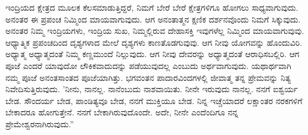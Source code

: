 ಇಂದ್ರಿಯದ ಕ್ಷೇತ್ರದ ಮೂಲಕ ಕೆಲಸಮಾಡುತ್ತಿದ್ದರೆ, ನಿಮಗೆ ಬೇರೆ ಬೇರೆ ಕ್ಷೇತ್ರಗಳಿಗೂ ಹೋಗಲು ಸಾಧ್ಯವಾಗುವುದು. ಅನಂತರ ಈ ಪ್ರಪಂಚ ನಿಮ್ಮಿಂದ ಮಾಯವಾಗುವುದು. ಆಗ ಅನಂತಾತ್ಮನ ಕ್ಷಣಿಕ ದರ್ಶನವೊಂದು ನಿಮಗೆ ಸಿಕ್ಕುವುದು. ಅನಂತರ ನಿಮ್ಮ ಇಂದ್ರಿಯಗಳು, ಇಂದ್ರಿಯ ಸುಖ, ನಿಮ್ಮಲ್ಲಿರುವ ದೇಹಾಸಕ್ತಿ ಇವುಗಳೆಲ್ಲ ನಿಮ್ಮಿಂದ ಮಾಯವಾಗುವುವು. ಆಧ್ಯಾತ್ಮಿಕ ಪ್ರಪಂಚದಿಂದ ದೃಶ್ಯಗಳಾದ ಮೇಲೆ ದೃಶ್ಯಗಳು ಕಾಣತೊಡಗುವುವು. ಆಗ ನೀವು ಯೋಗವನ್ನು ಹೊಂದುವಿರಿ. ಅಧ್ಯಾತ್ಮ ಅಧ್ಯಾತ್ಮದಂತೆ ನಿಮ್ಮ ಕಣ್ಣಮುಂದೆ ನಿಲ್ಲುವುದು. ಆಗ ನೀವು ದೇವರನ್ನು ಅಧ್ಯಾತ್ಮದಂತೆ ಆರಾಧಿಸಬಲ್ಲಿರಿ. ಆಗ ಪೂಜೆ ಎಂದರೆ ಯಾವುದೋ ಲೌಕಿಕವಾದುದನ್ನು ಪಡೆಯುವುದಲ್ಲ ಎಂಬುದು ಅರ್ಥವಾಗುವುದು. ಯಥಾರ್ಥವಾಗಿ ನಮ್ಮ ಪೂಜೆ ಅನಂತಸಾಂತದ ಪೂಜೆಯಾಗಿತ್ತು. ಭಗವಂತನ ಪಾದಾರವಿಂದಗಳಲ್ಲಿ ಜೀವಾತ್ಮ ತನ್ನ ಪ್ರೇಮವನ್ನು ನಿತ್ಯ ನಿವೇದಿಸುತ್ತಿರುವುದು. 'ನೀನು, ನಾನಲ್ಲ. ನಾನೆಂಬುದು ನಾಶವಾಯಿತು. ನೀನೇ ಇರುವುದು ನಾನಲ್ಲ. ನನಗೆ ಐಶ್ವರ್ಯ ಬೇಡ. ಸೌಂದರ್ಯ ಬೇಡ, ಪಾಂಡಿತ್ಯವೂ ಬೇಡ, ನನಗೆ ಮುಕ್ತಿಯೂ ಬೇಡ. ನಿನ್ನ ಇಚ್ಚೆಯಾದರೆ ಲಕ್ಷಾಂತರ ನರಕಗಳಿಗೆ ಬೇಕಾದರೂ ಹೋಗುತ್ತೇನೆ. ನನಗೆ ಬೇಕಾಗಿರುವುದೊಂದೇ. ಅದೇ, ನೀನೇ ಎಂದೆಂದಿಗೂ ನನ್ನ ಪ್ರೇಮೇಶ್ವರನಾಗಿರುವುದು.”

